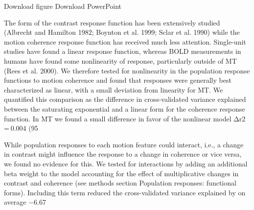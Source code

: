 \documentclass{report}
\begin{document}
Download figure Download PowerPoint

The form of the contrast response function has been extensively studied (Albrecht and Hamilton 1982; Boynton et al. 1999; Sclar et al. 1990) while the motion coherence response function has received much less attention. Single-unit studies have found a linear response function, whereas BOLD measurements in humans have found some nonlinearity of response, particularly outside of MT (Rees et al. 2000). We therefore tested for nonlinearity in the population response functions to motion coherence and found that responses were generally best characterized as linear, with a small deviation from linearity for MT. We quantified this comparison as the difference in cross-validated variance explained between the saturating exponential and a linear form for the coherence response function. In MT we found a small difference in favor of the nonlinear model Δr2 = 0.004 (95%

While population responses to each motion feature could interact, i.e., a change in contrast might influence the response to a change in coherence or vice versa, we found no evidence for this. We tested for interactions by adding an additional beta weight to the model accounting for the effect of multiplicative changes in contrast and coherence (see methods section Population responses: functional forms). Including this term reduced the cross-validated variance explained by on average −6.67%
\end{document}
